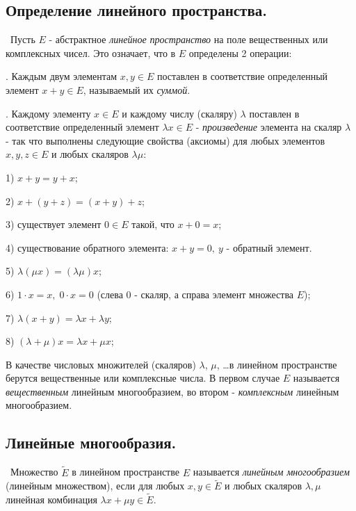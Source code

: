 \subsection*{Определение линейного пространства.}

\noindent \textasteriskcentered~Пусть $E$ - абстрактное \textit{линейное пространство} на поле вещественных или комплексных чисел. Это означает, что в $E$ определены 2 операции:

. Каждым двум элементам $x, y \in E$ поставлен в соответствие определенный элемент $x + y \in E$, называемый их \textit{суммой}.

. Каждому элементу $x \in E$ и каждому числу (скаляру) $\lambda$ поставлен в соответствие определенный элемент $\lambda x \in E$ - \textit{произведение} элемента на скаляр $\lambda$ - так что выполнены следующие свойства (аксиомы) для любых элементов $x, y, z \in E$ и любых скаляров $\lambda \mu$:

1) $x + y = y + x$;

2) $x + (y + z) = (x + y) + z$;

3) существует элемент $0 \in E$ такой, что $x + 0 = x$;

4) существование обратного элемента: $x + y = 0,~y$ - обратный элемент.

5) $\lambda(\mu x) = (\lambda \mu) x$;

6) $1 \cdot x = x, \; 0 \cdot x = 0$ (слева 0 - скаляр, а справа элемент множества $E$);

7) $\lambda (x + y) = \lambda x + \lambda y$;

8) $(\lambda + \mu) x = \lambda x + \mu x$;

\noindent В качестве числовых множителей (скаляров) $\lambda$, $\mu$, \dots в линейном пространстве берутся вещественные или комплексные числа. В первом случае $E$ называется \textit{вещественным} линейным многообразием, во втором - \textit{комплексным} линейным многообразием.


\subsection*{Линейные многообразия.}

\noindent \textasteriskcentered~Множество $\widetilde{E}$ в линейном пространстве $E$ называется \textit{линейным многообразием} (линейным множеством), если для любых $x, y \in \widetilde{E}$ и любых скаляров $\lambda, \mu$ линейная комбинация $\lambda x + \mu y \in \widetilde{E}$.

